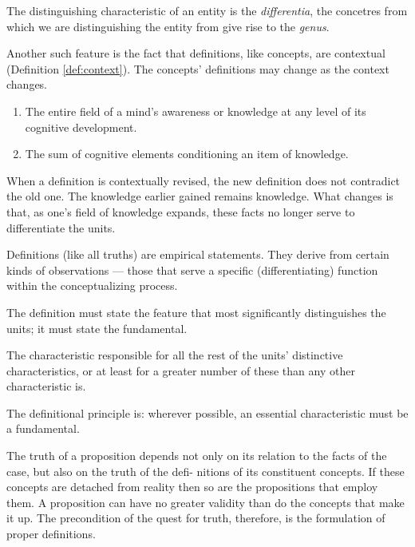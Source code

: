         The distinguishing characteristic of an entity is the \textit{differentia}, the concetres from which we are distinguishing the entity from give rise to the \textit{genus}.

        Another such feature is the fact that definitions, like concepts, are contextual (Definition \ref{def:context}). The concepts' definitions may change as the context changes.

            \begin{definition}[Context]
            \label{def:context}
                \begin{enumerate}
                    \item The entire field of a mind's awareness or knowledge at any level of its cognitive development.
                    \item The sum of cognitive elements conditioning an item of knowledge.
                \end{enumerate}
            \end{definition}

        When a definition is contextually revised, the new definition does not contradict the old one. The knowledge earlier gained remains knowledge. What changes is that, as one's field of knowledge expands, these facts no longer serve to differentiate the units.

        Definitions (like all truths) are  empirical statements. They derive from certain kinds of observations — those that serve a specific (differentiating) function within the conceptualizing process.

        The definition must state the feature that most significantly distinguishes the units; it must state the fundamental. 

            \begin{definition}[Fundamental]
            \label{def:fundamental}
                The characteristic responsible for all the rest of the units' distinctive characteristics, or at least for a greater number of these than any other characteristic is.
            \end{definition}

        The definitional principle is: wherever possible, an essential characteristic must be a fundamental.

        The truth of a proposition depends not only on its relation to the facts of the case, but also on the truth of the defi- nitions of its constituent concepts. If these concepts are detached from reality then so are the propositions that employ them. A proposition can have no greater validity than do the concepts that make it up. The precondition of the quest for truth, therefore, is the formulation of proper definitions.

